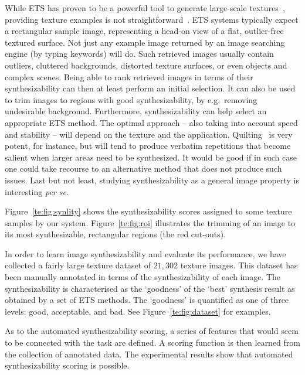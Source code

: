 While ETS has proven to be a powerful tool to generate large-scale
textures~\citep{WLKT09}, providing texture examples is not
straightforward~\citep{lockerman2013arxiv}. ETS systems typically
expect a rectangular sample image, representing a head-on view of a
flat, outlier-free textured surface. Not just any example image
returned by an image searching engine (by typing keywords) will do.
Such retrieved images usually contain outliers, cluttered backgrounds,
distorted texture surfaces, or even objects and complex scenes. Being
able to rank retrieved images in terms of their synthesizability can
then at least perform an initial selection. It can also be used to
trim images to regions with good synthesizability, by e.g.~removing
undesirable background. Furthermore, synthesizability can help select
an appropriate ETS method. The optimal approach -- also taking into
account speed and stability -- will depend on the texture and the
application. Quilting~\citep{Efros:sig2001} is very potent, for
instance, but will tend to produce verbatim repetitions that become
salient when larger areas need to be synthesized. It would be good if
in such case one could take recourse to an alternative method that
does not produce such issues. Last but not least, studying
synthesizability as a general image property is interesting {\em per
  se}.

Figure~\ref{te:fig:synlity} shows the synthesizability scores assigned to some texture samples 
by our system. Figure~\ref{te:fig:roi} illustrates the trimming of an image to its most
synthesizable, rectangular regions (the red cut-outs).

In order to learn image synthesizability and evaluate its performance, we have collected
a fairly large texture dataset of $21,302$ texture images. This dataset has been manually annotated 
in terms of the synthesizability of each image. The synthesizability is characterised as the 
`goodness' of the `best' synthesis result as obtained by a set of ETS methods. The `goodness' is quantified 
as one of three levels: good, acceptable, and bad. See Figure~\ref{te:fig:dataset} for examples. 



As to the automated synthesizability scoring, a series of features
that would seem to be connected with the task are defined.  A scoring
function is then learned from the collection of annotated data.  The
experimental results show that automated synthesizability scoring is
possible.

